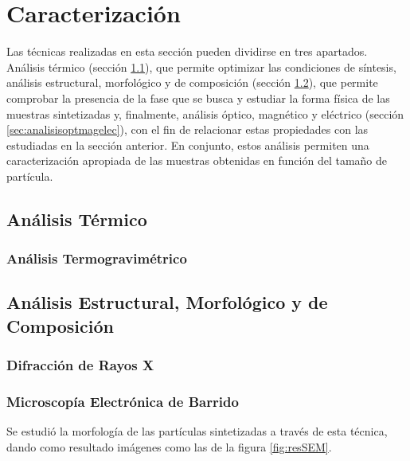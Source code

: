 \documentclass[../main.tex]{subfiles}
\begin{document}
\section{Caracterización}
Las técnicas realizadas en esta sección pueden dividirse en tres apartados. Análisis térmico (sección \ref{sec:analisistermico}), que permite optimizar las condiciones de síntesis, análisis estructural, morfológico y de composición (sección \ref{sec:analisisestruc}), que permite comprobar la presencia de la fase que se busca y estudiar la forma física de las muestras sintetizadas y, finalmente, análisis óptico, magnético y eléctrico (sección \ref{sec:analisisoptmagelec}), con el fin de relacionar estas propiedades con las estudiadas en la sección anterior. En conjunto, estos análisis permiten una caracterización apropiada de las muestras obtenidas en función del tamaño de partícula.
\subsection{Análisis Térmico} \label{sec:analisistermico}
\subsubsection{Análisis Termogravimétrico} \label{sec:TGA}

\subsection{Análisis Estructural, Morfológico y de Composición} \label{sec:analisisestruc}
\subsubsection{Difracción de Rayos X}

\subsubsection{Microscopía Electrónica de Barrido}
Se estudió la morfología de las partículas sintetizadas a través de esta técnica, dando como resultado
imágenes como las de la figura \ref{fig:resSEM}.
\end{document}
